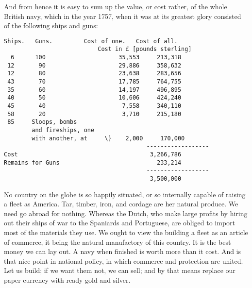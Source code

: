 \documentclass[12pt,oneside]{memoir}
\begin{document}
And from hence it is easy to sum up the value, or cost rather, of
the whole British navy, which in the year 1757, when it was at its
greatest glory consisted of the following ships and guns:

\begin{verbatim}
Ships.   Guns. 		   Cost of one.   Cost of all.
                           Cost in £ [pounds sterling]
  6      100                     35,553     213,318
 12       90                     29,886     358,632
 12       80                     23,638     283,656
 43       70                     17,785     764,755
 35       60                     14,197     496,895
 40       50                     10,606     424,240
 45       40                      7,558     340,110
 58       20                      3,710     215,180
 85     Sloops, bombs
        and fireships, one
        with another, at     \}    2,000     170,000
                                         ------------------
Cost                                      3,266,786
Remains for Guns                            233,214
                                         ------------------
                                          3,500,000
\end{verbatim}

No country on the globe is so happily situated, or so internally
capable of raising a fleet as America. Tar, timber, iron, and
cordage are her natural produce. We need go abroad for nothing.
Whereas the Dutch, who make large profits by hiring out their ships
of war to the Spaniards and Portuguese, are obliged to import most
of the materials they use. We ought to view the building a fleet as
an article of commerce, it being the natural manufactory of this
country. It is the best money we can lay out. A navy when finished
is worth more than it cost. And is that nice point in national
policy, in which commerce and protection are united. Let us build;
if we want them not, we can sell; and by that means replace our
paper currency with ready gold and silver.
\end{document}
